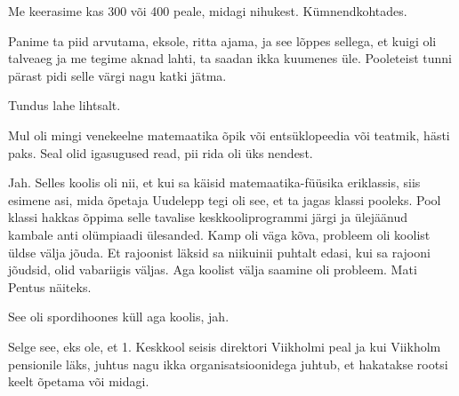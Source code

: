 
Me keerasime kas 300 või 400 peale, midagi nihukest. Kümnendkohtades.

Panime ta piid arvutama, eksole, ritta ajama, ja see lõppes sellega, et 
kuigi oli talveaeg ja me tegime aknad lahti, ta saadan ikka kuumenes üle. 
Pooleteist tunni pärast pidi selle värgi nagu katki jätma.
                 

Tundus lahe lihtsalt.

                 
Mul oli mingi venekeelne matemaatika õpik või  
entsüklopeedia või teatmik, hästi paks. Seal olid igasugused read, pii rida oli 
üks nendest.


Jah. Selles koolis oli nii, et kui sa käisid 
matemaatika-füüsika eriklassis, siis esimene asi, mida õpetaja 
Uudelepp tegi oli see, et 
ta jagas klassi pooleks. Pool klassi hakkas õppima selle tavalise 
keskkooliprogrammi järgi ja ülejäänud kambale anti olümpiaadi ülesanded. Kamp 
oli 
väga kõva, probleem oli koolist üldse välja jõuda. Et rajoonist läksid sa 
niikuinii puhtalt edasi, kui sa rajooni jõudsid, olid vabariigis 
väljas. Aga koolist välja saamine oli probleem. Mati 
Pentus näiteks. 
               

See oli spordihoones küll aga koolis, jah. 


Selge see, eks ole, et 1. Keskkool seisis direktori Viikholmi peal ja kui 
Viikholm pensionile läks,  juhtus nagu ikka organisatsioonidega juhtub, et 
hakatakse rootsi keelt õpetama või midagi.

